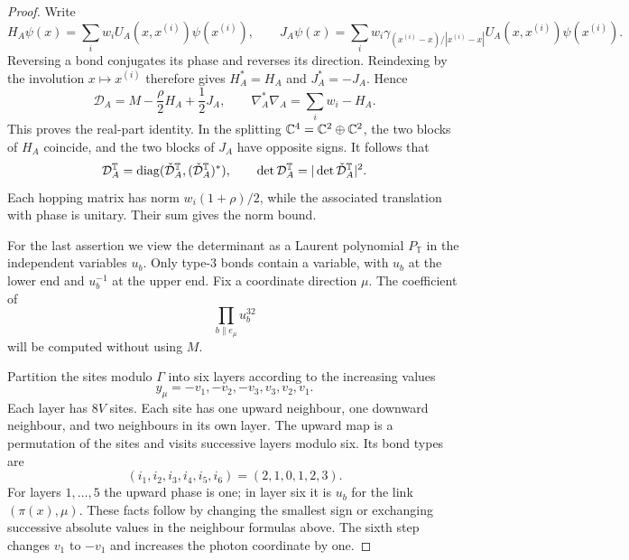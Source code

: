 \begin{proof}
Write
\[
 H_A\psi(x)=\sum_iw_iU_A(x,x^{(i)})\psi(x^{(i)}),\qquad
 J_A\psi(x)=\sum_iw_i\gamma_{(x^{(i)}-x)/|x^{(i)}-x|}
                         U_A(x,x^{(i)})\psi(x^{(i)}).
\]
Reversing a bond conjugates its phase and reverses its direction.
Reindexing by the involution $x\mapsto x^{(i)}$ therefore gives
$H_A^*=H_A$ and $J_A^*=-J_A$. Hence
\[
 \mathcal D_A=M-\frac\rho2H_A+\frac12J_A,\qquad
 \nabla_A^*\nabla_A=\sum_iw_i-H_A.
\]
This proves the real-part identity. In the splitting
$\mathbb C^4=\mathbb C^2\oplus\mathbb C^2$, the two blocks of $H_A$ coincide, and the two
blocks of $J_A$ have opposite signs. It follows that
\begin{equation}\label{eq:reg-two-blocks}
 \mathcal D_A^{\mathbb T}=\operatorname{diag}(\check{\mathcal D}_A^{\mathbb T},
                                      (\check{\mathcal D}_A^{\mathbb T})^*),
 \qquad \det \mathcal D_A^{\mathbb T}=|\det\check{\mathcal D}_A^{\mathbb T}|^2.
\end{equation}
Each hopping matrix has norm $w_i(1+\rho)/2$, while the associated
translation with phase is unitary. Their sum gives the norm bound.

For the last assertion we view the determinant as a Laurent
polynomial $P_{\mathbb T}$ in the independent variables $u_b$.
Only type-$3$ bonds contain a variable, with $u_b$ at the lower end
and $u_b^{-1}$ at the upper end. Fix a coordinate direction $\mu$.
The coefficient of
\begin{equation}\label{eq:reg-extreme-monomial}
 \prod_{b\parallel e_\mu}u_b^{32}
\end{equation}
will be computed without using $M$.

Partition the sites modulo $\Gamma$ into six layers according to
the increasing values
\[
 y_\mu=-v_1,-v_2,-v_3,v_3,v_2,v_1.
\]
Each layer has $8V$ sites. Each site has one upward neighbour,
one downward neighbour, and two neighbours in its own layer. The
upward map is a permutation of the sites and visits successive layers
modulo six. Its bond types are
\begin{equation}\label{eq:reg-upward-types}
 (i_1,i_2,i_3,i_4,i_5,i_6)=(2,1,0,1,2,3).
\end{equation}
For layers $1,\ldots,5$ the upward phase is one; in layer six it is
$u_b$ for the link $(\pi(x),\mu)$. These facts follow by changing the
smallest sign or exchanging successive absolute values in the
neighbour formulas above. The sixth step changes $v_1$ to $-v_1$
and increases the photon coordinate by one.


\end{proof}
